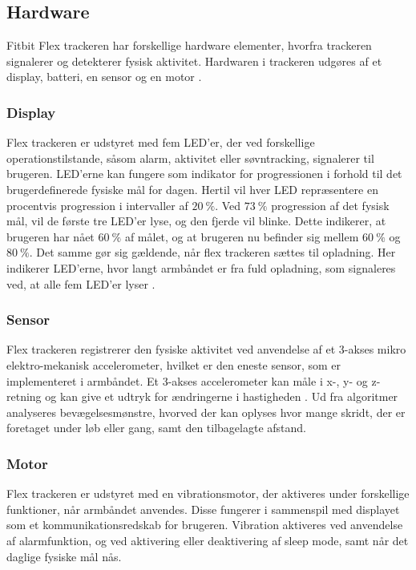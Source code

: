 \subsection{Hardware}
Fitbit Flex trackeren har forskellige hardware elementer, hvorfra trackeren signalerer og detekterer fysisk aktivitet. Hardwaren i trackeren udgøres af et display, batteri, en sensor og en motor \citep{fitbitflex}.
 
\subsubsection{Display} 
Flex trackeren er udstyret med fem LED'er, der ved forskellige operationstilstande, såsom alarm, aktivitet eller søvntracking, signalerer til brugeren. 
LED'erne kan fungere som indikator for progressionen i forhold til det brugerdefinerede fysiske mål for dagen. Hertil vil hver LED repræsentere en procentvis progression i intervaller af $20~\%$. Ved $73~\%$ progression af det fysisk mål, vil de første tre LED'er lyse, og den fjerde vil blinke. Dette indikerer, at brugeren har nået $60~\%$ af målet, og at brugeren nu befinder sig mellem $60~\%$ og $80~\%$. 
Det samme gør sig gældende, når flex trackeren sættes til opladning. Her indikerer LED'erne, hvor langt armbåndet er fra fuld opladning, som signaleres ved, at alle fem LED'er lyser \citep{fitbitflex}. 

\subsubsection{Sensor} 
Flex trackeren registrerer den fysiske aktivitet ved anvendelse af et 3-akses mikro elektro-mekanisk accelerometer, hvilket er den eneste sensor, som er implementeret i armbåndet. Et 3-akses accelerometer kan måle i x-, y- og z-retning og kan give et udtryk for ændringerne i hastigheden \citep{ravi2005}. Ud fra algoritmer analyseres bevægelsesmønstre, hvorved der kan oplyses hvor mange skridt, der er foretaget under løb eller gang, samt den tilbagelagte afstand. 

\subsubsection{Motor}
Flex trackeren er udstyret med en vibrationsmotor, der aktiveres under forskellige funktioner, når armbåndet anvendes. Disse fungerer i sammenspil med displayet som et kommunikationsredskab for brugeren. Vibration aktiveres ved anvendelse af alarmfunktion, og ved aktivering eller deaktivering af sleep mode, samt når det daglige fysiske mål nås. 


